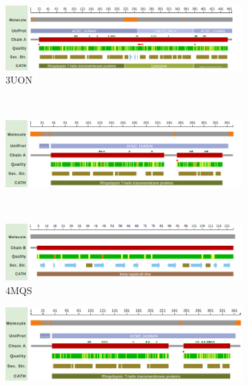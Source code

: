 \documentclass[10pt]{article}\usepackage[]{graphicx}\usepackage[]{color}
\theoremstyle{plain}
\begin{document}
\begin{multicols*}{2}
  \begin{figure}[p]
    \centering \phantom{h}
    \vspace{-2cm}
    \begin{subfigure}[H]{\textwidth}
      \includegraphics[width=.9\textwidth]{../figures/3uon_mutations}
      \caption{3UON}
    \end{subfigure}\\
    \begin{subfigure}[H]{\textwidth}
      \includegraphics[width=.9\textwidth]{../figures/4mqs_mutations}
    \end{subfigure}\\
    \begin{subfigure}[H]{\textwidth}
      \includegraphics[width=.9\textwidth]{../figures/4mqs_macro_nano}
      \caption{4MQS}
    \end{subfigure}
    \begin{subfigure}[H]{\textwidth}
      \includegraphics[width=.9\textwidth]{../figures/4mqt_mutations}
    \end{subfigure}

\end{figure}
\end{multicols*}
\end{document}
